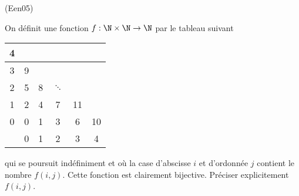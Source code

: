 \begin{tiny}(Een05)\end{tiny} On définit une fonction $f:\N\times\N\rightarrow\N$ par le tableau suivant
\begin{center}
\renewcommand{\arraystretch}{1.2}
\begin{tabular}{c|c|c|c|c|c}
4 &  &  &  &  &  \\ \hline
3 & 9 &  &  &  &  \\ \hline
2 & 5 & 8 & $\ddots$ &  &  \\ \hline
1 & 2 & 4 & 7 & 11 &  \\ \hline
0 & 0 & 1 & 3 & 6 & 10 \\ \hline
 & 0 & 1 & 2 & 3 & 4
\end{tabular}
\end{center}
qui se poursuit indéfiniment et où la case d'abscisse $i$ et d'ordonnée $j$ contient le nombre $f(i,j)$. Cette fonction est clairement bijective. Préciser explicitement $f(i,j)$.